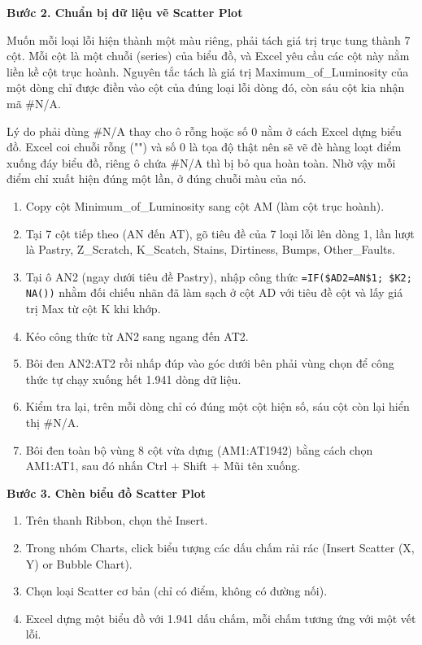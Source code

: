 \documentclass[12pt]{article}
\begin{document}
\noindent
\textbf{Bước 2. Chuẩn bị dữ liệu vẽ Scatter Plot}

\noindent
Muốn mỗi loại lỗi hiện thành một màu riêng, phải tách giá trị trục tung thành 7 cột. Mỗi cột là một chuỗi (series) của biểu đồ, và Excel yêu cầu các cột này nằm liền kề cột trục hoành. Nguyên tắc tách là giá trị Maximum\_of\_Luminosity của một dòng chỉ được điền vào cột của đúng loại lỗi dòng đó, còn sáu cột kia nhận mã \#N/A.

\noindent
Lý do phải dùng \#N/A thay cho ô rỗng hoặc số 0 nằm ở cách Excel dựng biểu đồ. Excel coi chuỗi rỗng ("") và số 0 là tọa độ thật nên sẽ vẽ đè hàng loạt điểm xuống đáy biểu đồ, riêng ô chứa \#N/A thì bị bỏ qua hoàn toàn. Nhờ vậy mỗi điểm chỉ xuất hiện đúng một lần, ở đúng chuỗi màu của nó.

\begin{enumerate}
  \item Copy cột Minimum\_of\_Luminosity sang cột AM (làm cột trục hoành).
  \item Tại 7 cột tiếp theo (AN đến AT), gõ tiêu đề của 7 loại lỗi lên dòng 1, lần lượt là Pastry, Z\_Scratch, K\_Scatch, Stains, Dirtiness, Bumps, Other\_Faults.
  \item Tại ô AN2 (ngay dưới tiêu đề Pastry), nhập công thức \texttt{=IF(\$AD2=AN\$1; \$K2; NA())} nhằm đối chiếu nhãn đã làm sạch ở cột AD với tiêu đề cột và lấy giá trị Max từ cột K khi khớp.
  \item Kéo công thức từ AN2 sang ngang đến AT2.
  \item Bôi đen AN2:AT2 rồi nhấp đúp vào góc dưới bên phải vùng chọn để công thức tự chạy xuống hết 1.941 dòng dữ liệu.
  \item Kiểm tra lại, trên mỗi dòng chỉ có đúng một cột hiện số, sáu cột còn lại hiển thị \#N/A.
  \item Bôi đen toàn bộ vùng 8 cột vừa dựng (AM1:AT1942) bằng cách chọn AM1:AT1, sau đó nhấn Ctrl + Shift + Mũi tên xuống.
\end{enumerate}

\noindent
\textbf{Bước 3. Chèn biểu đồ Scatter Plot}

\begin{enumerate}
  \item Trên thanh Ribbon, chọn thẻ Insert.
  \item Trong nhóm Charts, click biểu tượng các dấu chấm rải rác (Insert Scatter (X, Y) or Bubble Chart).
  \item Chọn loại Scatter cơ bản (chỉ có điểm, không có đường nối).
  \item Excel dựng một biểu đồ với 1.941 dấu chấm, mỗi chấm tương ứng với một vết lỗi.
\end{enumerate}
\end{document}
